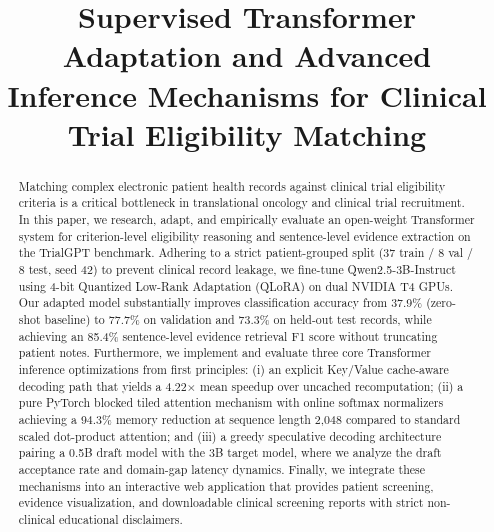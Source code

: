 \documentclass[conference]{IEEEtran}
\begin{document}
\title{Supervised Transformer Adaptation and Advanced Inference Mechanisms for Clinical Trial Eligibility Matching}

\author{
}

\maketitle

\begin{abstract}
Matching complex electronic patient health records against clinical trial eligibility criteria is a critical bottleneck in translational oncology and clinical trial recruitment. In this paper, we research, adapt, and empirically evaluate an open-weight Transformer system for criterion-level eligibility reasoning and sentence-level evidence extraction on the TrialGPT benchmark. Adhering to a strict patient-grouped split (37 train / 8 val / 8 test, seed 42) to prevent clinical record leakage, we fine-tune Qwen2.5-3B-Instruct using 4-bit Quantized Low-Rank Adaptation (QLoRA) on dual NVIDIA T4 GPUs. Our adapted model substantially improves classification accuracy from 37.9\% (zero-shot baseline) to 77.7\% on validation and 73.3\% on held-out test records, while achieving an 85.4\% sentence-level evidence retrieval F1 score without truncating patient notes. Furthermore, we implement and evaluate three core Transformer inference optimizations from first principles: (i) an explicit Key/Value cache-aware decoding path that yields a 4.22$\times$ mean speedup over uncached recomputation; (ii) a pure PyTorch blocked tiled attention mechanism with online softmax normalizers achieving a 94.3\% memory reduction at sequence length 2,048 compared to standard scaled dot-product attention; and (iii) a greedy speculative decoding architecture pairing a 0.5B draft model with the 3B target model, where we analyze the draft acceptance rate and domain-gap latency dynamics. Finally, we integrate these mechanisms into an interactive web application that provides patient screening, evidence visualization, and downloadable clinical screening reports with strict non-clinical educational disclaimers.
\end{abstract}
\end{document}
